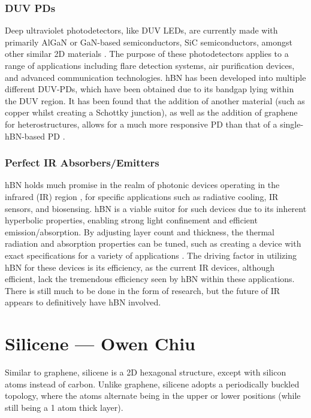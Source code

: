 \documentclass[conference]{IEEEtran}
\begin{document}
  \subsubsection{DUV PDs}

  Deep ultraviolet photodetectors, like DUV LEDs, are currently made with primarily AlGaN or GaN-based semiconductors, SiC semiconductors, amongst other similar 2D materials \cite{jb1}. The purpose of these photodetectors applies to a range of applications including flare detection systems, air purification devices, and advanced communication technologies. hBN has been developed into multiple different DUV-PDs, which have been obtained due to its bandgap lying within the DUV region. It has been found that the addition of another material (such as copper whilst creating a Schottky junction), as well as the addition of graphene for heterostructures, allows for a much more responsive PD than that of a single-hBN-based PD \cite{jb1}.

  \subsubsection{Perfect IR Absorbers/Emitters}

  hBN holds much promise in the realm of photonic devices operating in the infrared (IR) region \cite{jb2}, for specific applications such as radiative cooling, IR sensors, and biosensing. hBN is a viable suitor for such devices due to its inherent hyperbolic properties, enabling strong light confinement and efficient emission/absorption. By adjusting layer count and thickness, the thermal radiation and absorption properties can be tuned, such as creating a device with exact specifications for a variety of applications \cite{jb1}. The driving factor in utilizing hBN for these devices is its efficiency, as the current IR devices, although efficient, lack the tremendous efficiency seen by hBN within these applications. There is still much to be done in the form of research, but the future of IR appears to definitively have hBN involved.

\section{Silicene — Owen Chiu}

Similar to graphene, silicene is a 2D hexagonal structure, except with silicon atoms instead of carbon. Unlike graphene, silicene adopts a periodically buckled topology, where the atoms alternate being in the upper or lower positions (while still being a 1 atom thick layer).
\end{document}
